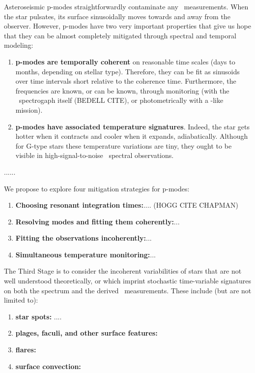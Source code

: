 \documentclass[12pt, letterpaper]{article}
\begin{document}

Asteroseismic p-modes straightforwardly contaminate any \EPRV\ measurements.
When the star pulsates, its surface sinusoidally moves towards and away from
the observer.
However, p-modes have two very important properties that give us hope that they
can be almost completely mitigated through spectral and temporal modeling:
\begin{enumerate}
\item
\textbf{p-modes are temporally coherent} on reasonable time scales (days to months, depending on
stellar type). Therefore, they can be fit as sinusoids over time intervals 
short relative to the coherence time. Furthermore, the frequencies are known,
or can be known, through monitoring (with the \EPRV\ spectrogaph itself (BEDELL CITE),
or photometrically with a \TESS-like mission).
\item
\textbf{p-modes have associated temperature signatures}. Indeed, the star gets
hotter when it contracts and cooler when it expands, adiabatically. Although for
G-type stars these temperature variations are tiny, they ought to be visible in
high-signal-to-noise \EPRV\ spectral observations.
\end{enumerate}

......

We propose to explore four mitigation strategies for p-modes:
\begin{enumerate}
\item
\textbf{Choosing resonant integration times:}.... (HOGG CITE CHAPMAN)
\item
\textbf{Resolving modes and fitting them coherently:}...
\item
\textbf{Fitting the observations incoherently:}...
\item
\textbf{Simultaneous temperature monitoring:}...
\end{enumerate}


The Third Stage is to consider the incoherent variabilities of stars
that are not well understood theoretically, or which imprint
stochastic time-variable signatures on both the spectrum and the
derived \RV\ measurements.
These include (but are not limited to):
\begin{enumerate}
\item
\textbf{star spots:} ....
\item
\textbf{plages, faculi, and other surface features:}
\item
\textbf{flares:}
\item
\textbf{surface convection:}
\end{enumerate}
\end{document}
